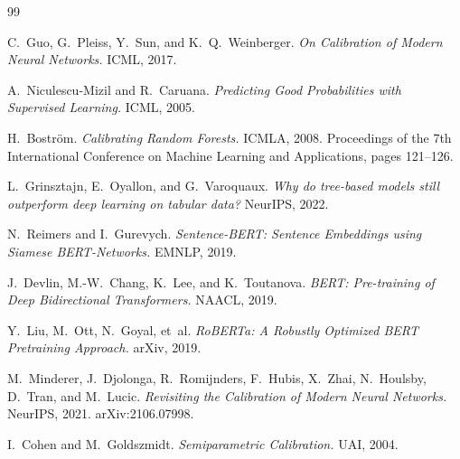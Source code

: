 \documentclass[11pt]{article}
\begin{document}
\begin{thebibliography}{99}

 C.~Guo, G.~Pleiss, Y.~Sun, and K.~Q.~Weinberger.
\newblock \textit{On Calibration of Modern Neural Networks.} ICML, 2017.

 A.~Niculescu-Mizil and R.~Caruana.
\newblock \textit{Predicting Good Probabilities with Supervised Learning.} ICML, 2005.

 H.~Bostr\"{o}m.
\newblock \textit{Calibrating Random Forests.} ICMLA, 2008.
\newblock Proceedings of the 7th International Conference on Machine Learning and
Applications, pages 121--126. %

 L.~Grinsztajn, E.~Oyallon, and G.~Varoquaux.
\newblock \textit{Why do tree-based models still outperform deep learning on tabular data?} NeurIPS, 2022.

 N.~Reimers and I.~Gurevych.
\newblock \textit{Sentence-BERT: Sentence Embeddings using Siamese BERT-Networks.} EMNLP, 2019.

 J.~Devlin, M.-W.~Chang, K.~Lee, and K.~Toutanova.
\newblock \textit{BERT: Pre-training of Deep Bidirectional Transformers.} NAACL, 2019.

 Y.~Liu, M.~Ott, N.~Goyal, et~al.
\newblock \textit{RoBERTa: A Robustly Optimized BERT Pretraining Approach.} arXiv, 2019.

 M.~Minderer, J.~Djolonga, R.~Romijnders,
F.~Hubis, X.~Zhai, N.~Houlsby, D.~Tran, and M.~Lucic.
\newblock \textit{Revisiting the Calibration of Modern Neural Networks.} NeurIPS, 2021.
\newblock arXiv:2106.07998.

 I.~Cohen and M.~Goldszmidt.
\newblock \textit{Semiparametric Calibration.} UAI, 2004.


\end{thebibliography}
\end{document}
